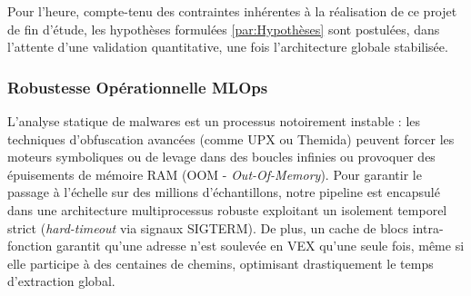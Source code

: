 \begin{coder}
  Pour l'heure, compte-tenu des contraintes inhérentes à la réalisation de ce projet de fin d'étude, les hypothèses formulées \ref{par:Hypothèses} sont postulées, dans l'attente d'une validation quantitative, une fois l'architecture globale stabilisée.
\end{coder}


\subsubsection{Robustesse Opérationnelle MLOps}
L'analyse statique de malwares est un processus notoirement instable : les techniques d'obfuscation avancées (comme UPX ou Themida) peuvent forcer les moteurs symboliques ou de levage dans des boucles infinies ou provoquer des épuisements de mémoire RAM (OOM - \textit{Out-Of-Memory}). Pour garantir le passage à l'échelle sur des millions d'échantillons, notre pipeline est encapsulé dans une architecture multiprocessus robuste exploitant un isolement temporel strict (\textit{hard-timeout} via signaux SIGTERM). De plus, un cache de blocs intra-fonction garantit qu'une adresse n'est soulevée en VEX qu'une seule fois, même si elle participe à des centaines de chemins, optimisant drastiquement le temps d'extraction global.

